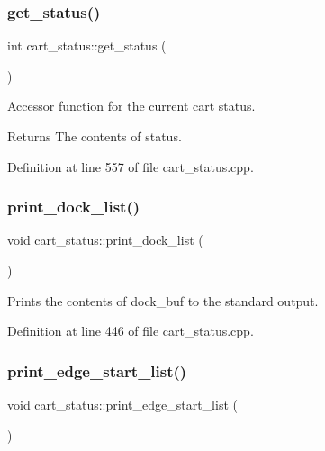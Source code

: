 \subsubsection{\texorpdfstring{get\+\_\+status()}{get\_status()}}
{\footnotesize\ttfamily int cart\+\_\+status\+::get\+\_\+status (\begin{DoxyParamCaption}{ }\end{DoxyParamCaption})}

Accessor function for the current cart status. \begin{DoxyReturn}{Returns}
The contents of status. 
\end{DoxyReturn}


Definition at line 557 of file cart\+\_\+status.\+cpp.

\mbox{\label{classcart__status_ae58ecd2c7d79aa9d35eec0bbfd1c7a32}} 
\subsubsection{\texorpdfstring{print\+\_\+dock\+\_\+list()}{print\_dock\_list()}}
{\footnotesize\ttfamily void cart\+\_\+status\+::print\+\_\+dock\+\_\+list (\begin{DoxyParamCaption}{ }\end{DoxyParamCaption})}

Prints the contents of dock\+\_\+buf to the standard output. 

Definition at line 446 of file cart\+\_\+status.\+cpp.

\mbox{\label{classcart__status_a52ef441e0a19a051270909656efbc30e}} 
\subsubsection{\texorpdfstring{print\+\_\+edge\+\_\+start\+\_\+list()}{print\_edge\_start\_list()}}
{\footnotesize\ttfamily void cart\+\_\+status\+::print\+\_\+edge\+\_\+start\+\_\+list (\begin{DoxyParamCaption}{ }\end{DoxyParamCaption})}


